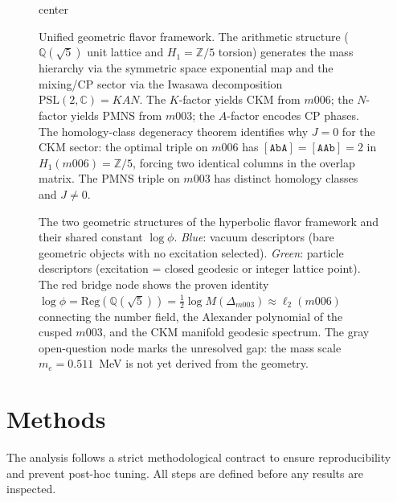﻿\documentclass[12pt]{article}
\theoremstyle{definition}
\begin{document}
\begin{figure}[htbp]
{\begin{adjustbox}{center}
\end{adjustbox}}
\caption{Unified geometric flavor framework. The arithmetic structure
($\mathbb{Q}(\sqrt{5})$ unit lattice and $H_1=\mathbb{Z}/5$ torsion)
generates the mass hierarchy via the symmetric space exponential map
and the mixing/CP sector via the Iwasawa decomposition
$\mathrm{PSL}(2,\mathbb{C})=KAN$. The $K$-factor yields CKM from $m006$;
the $N$-factor yields PMNS from $m003$; the $A$-factor encodes CP phases.
The homology-class degeneracy theorem identifies why $J=0$ for the CKM sector:
the optimal triple on $m006$ has $[\texttt{AbA}]=[\texttt{AAb}]=2$
in $H_1(m006)=\mathbb{Z}/5$, forcing two identical columns in the overlap matrix.
The PMNS triple on $m003$ has distinct homology classes and $J\neq 0$.}
\label{fig:framework}
\end{figure}



\begin{figure}[htbp]
\centering
%
\caption{The two geometric structures of the hyperbolic flavor framework
and their shared constant $\log\phi$. \textit{Blue}: vacuum descriptors
(bare geometric objects with no excitation selected).
\textit{Green}: particle descriptors (excitation = closed geodesic or
integer lattice point). The red bridge node shows the proven identity
$\log\phi = \mathrm{Reg}(\mathbb{Q}(\sqrt5)) = \tfrac{1}{2}\log
M(\Delta_{m003}) \approx \ell_2(m006)$ connecting the number field,
the Alexander polynomial of the cusped $m003$, and the CKM manifold
geodesic spectrum. The gray open-question node marks the unresolved
gap: the mass scale $m_e = 0.511$~MeV is not yet derived from the
geometry.}
\label{fig:two_structures}
\end{figure}

\section{Methods}
\label{sec:methods}

The analysis follows a strict methodological contract to ensure reproducibility and prevent post-hoc tuning. All steps are defined before any results are inspected.
\end{document}
